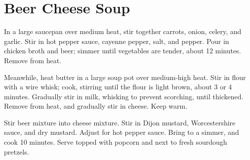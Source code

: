 \section{Beer Cheese Soup}
\begin{recipe}





In a large saucepan over medium heat, stir together carrots, onion, celery, and garlic. Stir in hot pepper sauce, cayenne pepper, salt, and pepper. Pour in chicken broth and beer; simmer until vegetables are tender, about 12 minutes. Remove from heat.

Meanwhile, heat butter in a large soup pot over medium-high heat. Stir in flour with a wire whisk; cook, stirring until the flour is light brown, about 3 or 4 minutes. Gradually stir in milk, whisking to prevent scorching, until thickened. Remove from heat, and gradually stir in cheese. Keep warm.

Stir beer mixture into cheese mixture. Stir in Dijon mustard, Worcestershire sauce, and dry mustard. Adjust for hot pepper sauce. Bring to a simmer, and cook 10 minutes. Serve topped with popcorn and next to fresh sourdough pretzels.

\end{recipe}
